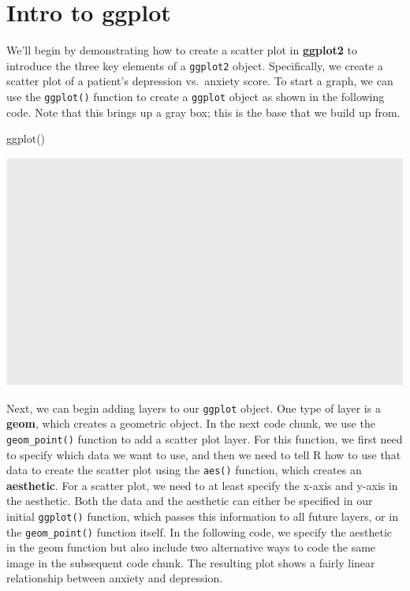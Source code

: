 \documentclass[
  letterpaper,
]{latex/krantz}
\makeatletter
\newenvironment{Shaded}{\begin{snugshade}}{\end{snugshade}}
\newcommand{\FunctionTok}[1]{\textcolor[rgb]{0.28,0.35,0.67}{#1}}
\newcommand{\NormalTok}[1]{\textcolor[rgb]{0.00,0.23,0.31}{#1}}
\newenvironment{kframe}{%
\medskip{}
\setlength{\fboxsep}{.8em}
 \def\at@end@of@kframe{}%
 \ifinner\ifhmode%
  \def\at@end@of@kframe{\end{minipage}}%
  \begin{minipage}{\columnwidth}%
 \fi\fi%
 \def\FrameCommand##1{\hskip\@totalleftmargin \hskip-\fboxsep
 \colorbox{shadecolor}{##1}\hskip-\fboxsep
     \hskip-\linewidth \hskip-\@totalleftmargin \hskip\columnwidth}%
 \MakeFramed {\advance\hsize-\width
   \@totalleftmargin\z@ \linewidth\hsize
   \@setminipage}}%
 {\par\unskip\endMakeFramed%
 \at@end@of@kframe}
\renewenvironment{Shaded}{\begin{kframe}}{\end{kframe}}
\makeatother
\begin{document}
\section{Intro to ggplot}\label{intro-to-ggplot}

We'll begin by demonstrating how to create a scatter plot
 in \textbf{ggplot2} to introduce the three
key elements of a \texttt{ggplot2}
object. Specifically, we create a scatter
plot of a patient's depression vs.~anxiety score. To start a graph, we
can use the
\texttt{ggplot()} function
to create a \texttt{ggplot} object as shown in the following code. Note
that this brings up a gray box; this is the base that we build up from.

\begin{Shaded}
\begin{Highlighting}[]
\FunctionTok{ggplot}\NormalTok{()}
\end{Highlighting}
\end{Shaded}

\begin{center}
\includegraphics[width=1\textwidth,height=\textheight]{book/visualization_ggplot_files/figure-pdf/unnamed-chunk-2-1.pdf}
\end{center}

Next, we can begin adding layers to our \texttt{ggplot} object. One type
of layer is a \textbf{geom}, which creates a
geometric object. In the next code chunk, we use the
\texttt{geom\_point()}
function to add a scatter plot layer. For this function, we first need
to specify which data we want to use, and then we need to tell R how to
use that data to create the scatter plot using the \texttt{aes()}
function, which creates an \textbf{aesthetic}.
For a scatter plot, we need to at least specify the x-axis and y-axis in
the aesthetic. Both the data and the aesthetic can either be specified
in our initial \texttt{ggplot()} function, which passes this information
to all future layers, or in the \texttt{geom\_point()} function itself.
In the following code, we specify the aesthetic in the geom function but
also include two alternative ways to code the same image in the
subsequent code chunk. The resulting plot shows a fairly linear
relationship between anxiety and depression.
\end{document}
